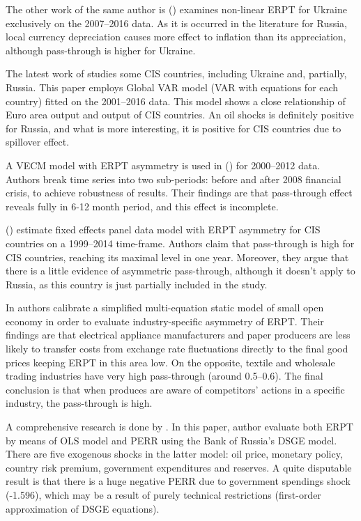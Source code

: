 \documentclass[12pt, a4paper]{extarticle}
\begin{document}
The other work of the same author is (\cite{Faryna2016a}) examines non-linear ERPT for Ukraine exclusively on the 2007--2016 data. As it is occurred in the literature for Russia, local currency depreciation causes more effect to inflation than its appreciation, although pass-through is higher for Ukraine.

The latest work of \textcite{Faryna2018} studies some CIS countries, including Ukraine and, partially, Russia. This paper employs Global VAR model (VAR with equations for each country) fitted on the 2001--2016 data. This model shows a close relationship of Euro area output and output of CIS countries. An oil shocks is definitely positive for Russia, and what is more interesting, it is positive for CIS countries due to spillover effect.

A VECM model with ERPT asymmetry is used in (\cite{Ponomarev2016}) for 2000--2012 data. Authors break time series into two sub-periods: before and after 2008 financial crisis, to achieve robustness of results. Their findings are that pass-through effect reveals fully in 6-12 month period, and this effect is incomplete.

(\textcite{Comunale2018}) estimate fixed effects panel data model with ERPT asymmetry for CIS countries on a 1999--2014 time-frame. Authors claim that pass-through is high for CIS countries, reaching its maximal level in one year. Moreover, they argue that there is a little evidence of asymmetric pass-through, although it doesn't apply to Russia, as this country is just partially included in the study.

In \cite{Sinyakov2019} authors calibrate a simplified multi-equation static model of small open economy in order to evaluate industry-specific asymmetry of ERPT. Their findings are that electrical appliance manufacturers and paper producers are less likely to transfer costs from exchange rate fluctuations directly to the final good prices keeping ERPT in this area low. On the opposite, textile and wholesale trading industries have very high pass-through (around 0.5--0.6). The final conclusion is that when produces are aware of competitors' actions in a specific industry, the pass-through is high.

A comprehensive research is done by \textcite{Khotulev2020}. In this paper, author evaluate both ERPT by means of OLS model and PERR using the Bank of Russia's DSGE model. There are five exogenous shocks in the latter model: oil price, monetary policy, country risk premium, government expenditures and reserves. A quite disputable result is that there is a huge negative PERR due to government spendings shock (-1.596), which may be a result of purely technical restrictions (first-order approximation of DSGE equations).
\end{document}
